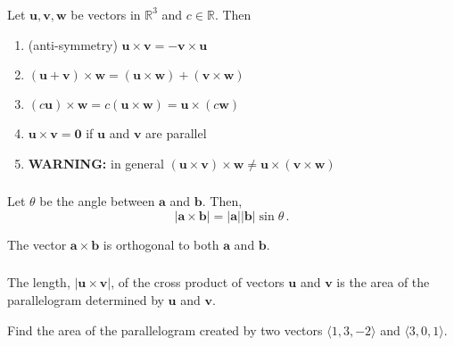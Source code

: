 \documentclass[aspectratio=169]{beamer}
\begin{document}
\begin{frame}
    \frametitle{\secname}
Let \(\mathbf{u}, \mathbf{v}, \mathbf{w}\) be vectors in \(\mathbb{R}^3\) and
\(c\in \mathbb{R}\). Then

\begin{enumerate}
\def\labelenumi{\arabic{enumi}.}
\item
  (anti-symmetry) \(\mathbf{u}\times \mathbf{v} = - \mathbf{v}\times \mathbf{u}\)
\item
  \((\mathbf{u} + \mathbf{v})\times \mathbf{w} = (\mathbf{u}\times \mathbf{w}) + (\mathbf{v}\times \mathbf{w})\)
\item
  \((c \mathbf{u})\times \mathbf{w} = c(\mathbf{u}\times \mathbf{w}) = \mathbf{u}\times (c\mathbf{w})\)
\item
  \(\mathbf{u}\times \mathbf{v} = \mathbf{0}\) if \(\mathbf{u}\) and \(\mathbf{v}\) are
  parallel
\item
  \textbf{WARNING:} in general
  \((\mathbf{u}\times \mathbf{v})\times \mathbf{w} \not = \mathbf{u}\times (\mathbf{v}\times \mathbf{w})\)
\end{enumerate}

\end{frame}


\begin{frame}
    \frametitle{\secname}
\begin{theorem}
Let \(\theta\) be the angle between \(\mathbf{a}\) and \(\mathbf{b}\). Then,
\begin{equation*}
    | \mathbf{a} \times \mathbf{b} | = |\mathbf{a}||\mathbf{b}| \sin\theta \,.
\end{equation*}
\end{theorem}


\begin{theorem}
The vector \(\mathbf{a}\times \mathbf{b}\) is orthogonal to both \(\mathbf{a}\) and \(\mathbf{b}\).
\end{theorem}

\end{frame}


\begin{frame}
    \frametitle{\secname}

\begin{theorem}
The length, \(|\mathbf{u}\times\mathbf{v}|\), of the cross product of
vectors \(\mathbf{u}\) and \(\mathbf{v}\) is the area of the parallelogram
determined by \(\mathbf{u}\) and \(\mathbf{v}\).
\end{theorem}

\begin{example}
    Find the area of the parallelogram created by two vectors
    $ \langle 1,3,-2 \rangle$ and $\langle 3,0,1 \rangle$.
\end{example}

\end{frame}
\end{document}
